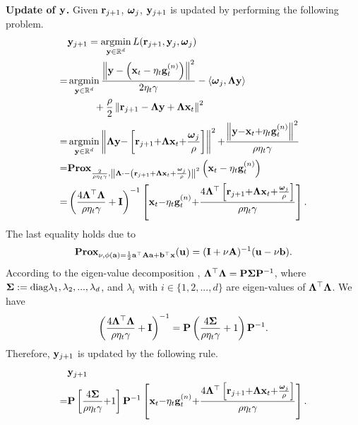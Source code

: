 \documentclass[journal]{IEEEtran}
\begin{document}
\textbf{Update of ${\bf y}$.} Given ${\bf r}_{j+1}$, $\boldsymbol{\omega}_j$, ${\bf y}_{j+1}$ is updated by performing the following problem.
\begin{align}
\nonumber
&\y_{j+1} = \argmin_{\y\in\RR^d} L(\r_{j+1}, \y_j, \bomega_j) \\ \nonumber
= & \argmin_{\y\in\RR^d} \frac{\lrnorm{\y - \lrincir{\x_t - \eta_t\g_t^{(n)}}}^2}{2\eta_t\gamma} - \lrangle{\bomega_j, \bLambda \y} \\ \nonumber 
& {~~~~~~~~} + \frac{\rho}{2}\lrnorm{\r_{j+1} - \bLambda \y + \bLambda\x_t}^2 \\ \nonumber
= & \argmin_{\y\in\RR^d} \lrnorm{\bLambda \y \mathrm{-} \left[\r_{j+1} \mathrm{+} \bLambda\x_t \mathrm{+} \frac{\bomega_j}{\rho}\right]}^2 \mathrm{+} \frac{\lrnorm{\y \mathrm{-} \x_t \mathrm{+} \eta_t\g_t^{(n)}}^2}{\rho\eta_t\gamma} \\ \nonumber
 = & \Prox_{\frac{2}{\rho\eta_t\gamma}, \lrnorm{\bLambda \cdot - \lrincir{\r_{j+1} + \bLambda\x_t + \frac{\bomega_j}{\rho}}}^2} \lrincir{\x_t - \eta_t\g_t^{(n)}} \\ \nonumber
= & \lrincir{\frac{4\bLambda^\top\bLambda}{\rho\eta_t\gamma} + \I}^{-1}\left[\x_t \mathrm{-} \eta_t\g_t^{(n)}\mathrm{+}\frac{4\bLambda^\top\left[\r_{j+1} \mathrm{+} \bLambda\x_t \mathrm{+} \frac{\bomega_j}{\rho}\right]}{\rho\eta_t\gamma}\right].
\end{align} The last equality holds due to 
\begin{align}
\nonumber
\textbf{Prox}_{\nu, \phi({\bf a}) = \frac{1}{2}{\bf a}^\top{\bf A}{\bf a}+{\bf b}^\top{\bf x}}({\bf u}) = ({\bf I} + \nu{\bf A})^{-1}({\bf u}-\nu{\bf b}).
\end{align} According to the eigen-value decomposition \cite{xx}, $\mathbf{\Lambda}^\top\mathbf{\Lambda} = {\bf P}\boldsymbol{\Sigma}{\bf P}^{-1}$, where $\boldsymbol{\Sigma} := {\rm diag}{\lambda_1, \lambda_2, ..., \lambda_d}$, and $\lambda_i$ with $i\in\{1,2, ..., d\}$ are eigen-values of $\mathbf{\Lambda}^\top\mathbf{\Lambda}$. We have 
\begin{align}
\nonumber
\left( \frac{4\mathbf{\Lambda}^\top\mathbf{\Lambda}}{\rho\eta_t\gamma} + {\bf I} \right)^{-1} = {\bf P}\left( \frac{4\boldsymbol{\Sigma}}{\rho\eta_t\gamma} + 1 \right){\bf P}^{-1}.
\end{align} Therefore, ${\bf y}_{j+1}$ is updated by the following rule.
\begin{align}
\nonumber
&{\bf y}_{j+1}  \\ \nonumber
= & {\bf P}\left[\frac{4\boldsymbol{\Sigma}}{\rho\eta_t\gamma} \mathrm{+} 1\right]{\bf P}^{\mathrm{-1}}\left[{\bf x}_t \mathrm{-} \eta_t{\bf g}_t^{(n)}\mathrm{+}\frac{4\mathbf{\Lambda}^\top\left[{\bf r}_{j+1} \mathrm{+} \mathbf{\Lambda}{\bf x}_t \mathrm{+} \frac{\boldsymbol{\omega}_j}{\rho}\right]}{\rho\eta_t\gamma}\right].
\end{align} 
\end{document}
